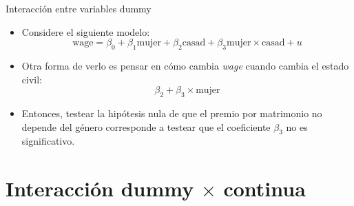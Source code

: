 \documentclass{beamer}
\begin{document}
\begin{frame}{Interacción entre variables dummy}
    \begin{itemize}
        \item Considere el siguiente modelo:
        \begin{equation*}
            \text{wage} = \beta_0 + \beta_1 \text{mujer} + \beta_2 \text{casad} + \beta_3 \text{mujer} \times \text{casad} + u
        \end{equation*}
        \item Otra forma de verlo es pensar en cómo cambia \textit{wage} cuando cambia el estado civil:
        \begin{equation*}
            \beta_2 + \beta_3 \times \text{mujer}
        \end{equation*}
        \item {\color{red}Entonces, testear la hipótesis nula de que el premio por matrimonio no depende del género corresponde a testear que el coeficiente \(\beta_3\) no es significativo.}

    \end{itemize}
\end{frame}

\section{Interacción dummy $\times$ continua}
\end{document}
